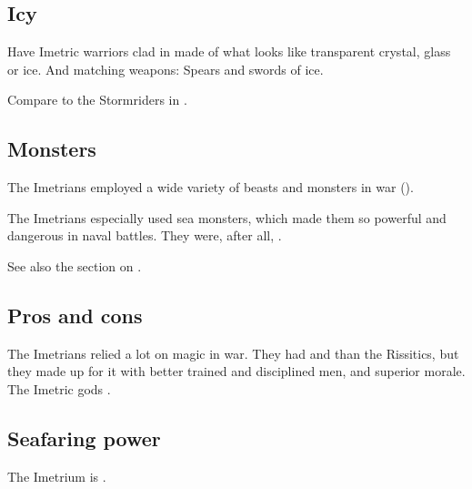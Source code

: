 \subsection{Icy \armour}
Have Imetric warriors clad in \armour made of what looks like transparent crystal, glass or ice. 
And matching weapons: 
Spears and swords of ice. 

Compare to the Stormriders in . 





\subsection{Monsters}
The Imetrians employed a wide variety of beasts and monsters in war ().

The Imetrians especially used sea monsters, which made them so powerful and dangerous in naval battles. 
They were, after all, . 

See also the section on . 





\subsection{Pros and cons}
The Imetrians relied a lot on magic in war. 
They had  and  than the Rissitics, but they made up for it with better trained and disciplined men, and superior morale.
The Imetric gods . 





\subsection{Seafaring power}
The Imetrium is . 















